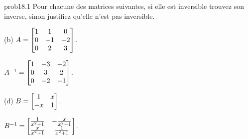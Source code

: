 

\begin{sol}{prob18.1} Pour chacune des matrices suivantes, si elle est inversible trouvez son inverse, sinon justifiez qu'elle n'est pas inversible.
\medskip

(b) $A=\bmatrix1&1&0\\
0&-1&-2\\
0&2&3\endbmatrix$.

\soln  $A^{-1}=\bmatrix 1 & -3 & -2 \\0 & 3 & 2 \\0 & -2 & -1 \endbmatrix$.
\medskip

(d) $B=\bmatrix  1&x\\ -x&1\endbmatrix$.
\medskip

\soln  $B^{-1}=\bmatrix\frac{1}{x^2+1} & -\frac{x}{x^2+1} \\\frac{x}{x^2+1} & \frac{1}{x^2+1} \endbmatrix$.

 
\end{sol}

